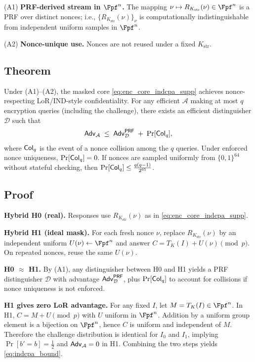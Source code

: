 (A1) \textbf{PRF-derived stream in $\Fpf^n$.}
The mapping $\nu \mapsto R_{K_{\mathrm{str}}}(\nu)\in\Fpf^n$ is a PRF over distinct nonces; i.e.,
$\{R_{K_{\mathrm{str}}}(\nu)\}_{\nu}$ is computationally indistinguishable from independent uniform
samples in $\Fpf^n$.

(A2) \textbf{Nonce-unique use.}
Nonces are not reused under a fixed $K_{\mathrm{str}}$.

\subsection{Theorem}
\label{subsec:app_lor_thm}

Under (A1)--(A2), the masked core \eqref{eq:enc_core_indcpa_supp} achieves nonce-respecting LoR/IND-style
confidentiality. For any efficient $\mathcal{A}$ making at most $q$ encryption queries (including the
challenge), there exists an efficient distinguisher $\mathcal{D}$ such that
\begin{equation}
\label{eq:indcpa_bound}
\mathsf{Adv}_{\mathcal{A}}
\;\le\;
\mathsf{Adv}^{\mathsf{PRF}}_{\mathcal{D}}
\;+\;
\Pr[\mathsf{Col}_q],
\end{equation}
where $\mathsf{Col}_q$ is the event of a nonce collision among the $q$ queries. Under enforced nonce uniqueness,
$\Pr[\mathsf{Col}_q]=0$. If nonces are sampled uniformly from $\{0,1\}^{64}$ without stateful checking, then
$\Pr[\mathsf{Col}_q]\le \frac{q(q-1)}{2^{65}}$.

\subsection{Proof}
\label{subsec:app_lor_proof}

\textbf{Hybrid H0 (real).} Responses use $R_{K_{\mathrm{str}}}(\nu)$ as in \eqref{eq:enc_core_indcpa_supp}.

\textbf{Hybrid H1 (ideal mask).} For each fresh nonce $\nu$, replace $R_{K_{\mathrm{str}}}(\nu)$ by an
independent uniform $U(\nu)\gets \Fpf^n$ and answer $C=T_K(I)+U(\nu)\pmod{p}$. On repeated nonces, reuse
the same $U(\nu)$.

\textbf{H0 $\approx$ H1.} By (A1), any distinguisher between H0 and H1 yields a PRF distinguisher
$\mathcal{D}$ with advantage $\mathsf{Adv}^{\mathsf{PRF}}_{\mathcal{D}}$, plus $\Pr[\mathsf{Col}_q]$ to account for collisions if
nonce uniqueness is not enforced.

\textbf{H1 gives zero LoR advantage.} For any fixed $I$, let $M=T_K(I)\in\Fpf^n$. In H1, $C=M+U\pmod{p}$
with $U$ uniform in $\Fpf^n$. Addition by a uniform group element is a bijection on $\Fpf^n$, hence $C$ is
uniform and independent of $M$. Therefore the challenge distribution is identical for $I_0$ and $I_1$,
implying $\Pr[b'=b]=\tfrac12$ and $\mathsf{Adv}_{\mathcal{A}}=0$ in H1. Combining the two steps yields
\eqref{eq:indcpa_bound}.

